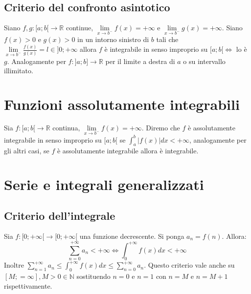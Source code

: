 \subsection{Criterio del confronto asintotico}
Siano $f,g:[a;b[\rightarrow\mathbb{R}$ continue, $\lim\limits_{x\rightarrow b^-}f(x)=+\infty$ e $\lim\limits_{x\rightarrow b^-}g(x)=+\infty$. Siano $f(x)>0$ e $g(x)>0$ in un 
intorno sinistro di $b$ tali che $\lim\limits_{x\rightarrow b^-}\frac{f(x)}{g(x)}=l\in]0;+\infty$ allora $f$ \`e integrabile in senso improprio su $[a;b[\Leftrightarrow$ lo \`e 
$g$. Analogamente  per $f:]a;b]\rightarrow\mathbb{R}$ per il limite a destra di $a$ o su intervallo illimitato.
\section{Funzioni assolutamente integrabili}
Sia $f:[a;b[\rightarrow\mathbb{R}$ continua, $\lim\limits_{x\rightarrow b^-}f(x)=+\infty$. Diremo che $f$ \`e assolutamente integrabile in senso improprio su $[a;b[$ se $
\int_a^b|f(x)|dx<+\infty$, analogamente per gli altri casi, se $f$ \`e assolutamente integrabile allora \`e integrabile.
\section{Serie e integrali generalizzati}
\subsection{Criterio dell'integrale}
Sia $f:[0;+\infty[\rightarrow[0;+\infty[$ una funzione decrescente. Si ponga $a_n=f(n)$. Allora:
\begin{equation}
\sum\limits_{n=0}^{+\infty}a_n<+\infty\Leftrightarrow\int_0^{+\infty}f(x)dx<+\infty
\end{equation}
Inoltre $\sum\limits_{n=1}^{+\infty}a_n\le \int_0^{+\infty}f(x)dx\le \sum\limits_{n=0}^{+\infty}a_n$. Questo criterio vale anche su $[M;=\infty],M>0\in\mathbb{N}$ sostituendo 
$n=0$ e $n=1$ con $n=M$ e $n=M+1$ rispettivamente.
